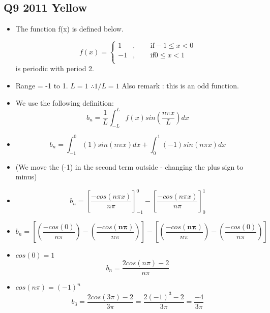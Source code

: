 \documentclass[11pt,a4paper,titlepage,oneside,openany]{article}
\numberwithin{equation}{section}
\numberwithin{algorithm}{section}
\numberwithin{figure}{section}
\numberwithin{table}{section}
\begin{document}
\newpage
\subsection*{Q9 2011 Yellow}
\Large{
\begin{itemize}
\item The function f(x) is defined below.

\begin{equation*}
        f(x)=\begin{cases}
          1 &,\qquad \text{if} -1 \leq x <0 \\
          -1 &,\qquad \text{if} 0 \leq x <1 \\
        \end{cases}
\end{equation*}
is periodic with period 2.
\item Range = -1 to 1. $L=1$ $\therefore 1/L = 1$ Also remark : this is an odd function.
\item We use the following definition: \[ b_n = \frac{1}{L}\int^{L}_{-L} f(x) sin(\frac{n\pi x}{L}) dx \]
\item \[ b_n = \int^{0}_{-1} (1) sin(n\pi x) dx + \int^{1}_{0} (-1) sin(n\pi x) dx \]
\item (We move the (-1) in the second term outside - changing the plus sign to minus)

\item \[ b_n = \left[ \frac{-cos(n\pi x)}{n\pi } \right]^{0}_{-1}  -  \left[  \frac{-cos(n\pi x)}{n\pi } \right] ^{1}_{0} \]

\item \[ b_n = \left[ \left( \frac{-cos(0)}{n\pi }\right) - \left(\frac{-cos(\boldsymbol{n\pi})}{n\pi }\right) \right] - \left[ \left( \frac{-cos(\boldsymbol{n\pi})}{n\pi }\right) - \left(\frac{-cos(0)}{n\pi }\right) \right] \]
\item $cos(0) = 1$
\[ b_n = \frac{2cos(n\pi)-2}{n\pi} \]
\item $cos(n\pi) = (-1)^n$
\[ b_3 = \frac{2cos(3\pi)-2}{3\pi} =  \frac{2(-1)^3-2}{3\pi}  =\frac{-4}{3\pi} \]
\end{itemize}
}
\newpage
\end{document}
